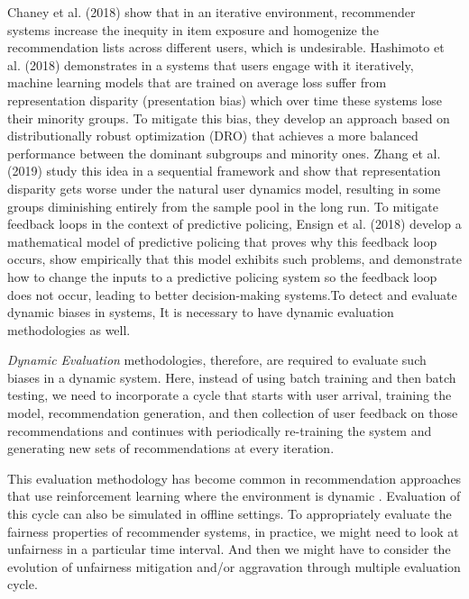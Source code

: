         Chaney et al. (2018) \cite{Chaney2018Homo} show that in an iterative environment, recommender systems increase the inequity in item exposure and homogenize the recommendation lists across different users, which is undesirable. Hashimoto et al. (2018) \cite{pmlr-v80-hashimoto18a} demonstrates in a systems that users engage with it iteratively, machine learning models that are trained on average loss suffer from representation disparity (presentation bias) which over time these systems lose their minority groups. To mitigate this bias, they develop an approach based on distributionally robust optimization (DRO) that achieves a more balanced performance between the dominant subgroups and minority ones. Zhang et al. (2019) \cite{NEURIPS2019_7690dd4d} study this idea in a sequential framework and show that representation disparity gets worse under the natural user dynamics model, resulting in some groups diminishing entirely from the sample pool in the long run. To mitigate feedback loops in the context of predictive policing, Ensign et al. (2018) \cite{pmlr-v81-ensign18a} develop a mathematical model of predictive policing that proves why this feedback loop occurs, show empirically that this model exhibits such problems, and demonstrate how to change the inputs to a predictive policing system so the feedback loop does not occur, leading to better decision-making systems.To detect and evaluate dynamic biases in systems, It is necessary to have dynamic evaluation methodologies as well.
        
        \textit{Dynamic Evaluation} methodologies, therefore, are required to evaluate such biases in a dynamic system. Here, instead of using batch training and then batch testing, we need to incorporate a cycle that starts with user arrival, training the model, recommendation generation, and then collection of user feedback on those recommendations and continues with periodically re-training the system and generating new sets of recommendations at every iteration.
        
        This evaluation methodology has become common in recommendation approaches that use reinforcement learning where the environment is dynamic \cite{Lihong2010bandit,Zheng2018DRN}. Evaluation of this cycle can also be simulated in offline settings. To appropriately evaluate the fairness properties of recommender systems, in practice, we might need to look at unfairness in a particular time interval. And then we might have to consider the evolution of unfairness mitigation and/or aggravation through multiple evaluation cycle.
        
